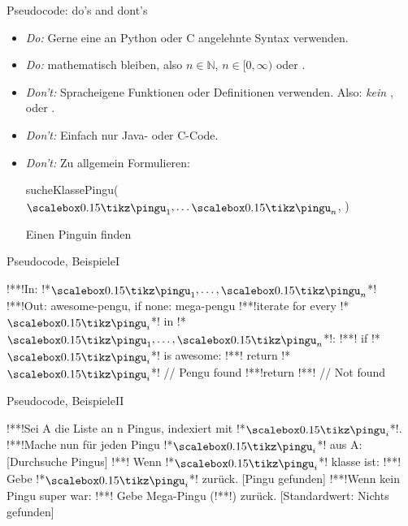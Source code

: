 \begin{frame}[t]{Pseudocode: do's and dont's}
    \begin{itemize}[<+(1)->]
        \itemsep7.5pt
        \item \emph{Do:} Gerne eine an Python oder C angelehnte Syntax verwenden.
        \item \emph{Do:} mathematisch bleiben, also $n \in \mathbb{N}$, $n \in [0,\infty)$ oder .
        \item \emph{Don't:} Spracheigene  Funktionen oder Definitionen verwenden.\pause{} Also: \emph{kein} ,  oder .
        \item \emph{Don't:} Einfach nur Java- oder C-Code.
        \item \emph{Don't:} Zu allgemein Formulieren:\smallskip\pause
\setcounter{algocf}{3}
\begin{algorithm}[H]
\PreCode
\StartCode
    \pause sucheKlassePingu($\tpingu_1, \ldots \tpingu_n$, \raisebox{-1pt}{\scalebox{0.15}{\tikz{\tagent}}})\;
    \caption{Einen  Pinguin finden}
\end{algorithm}
    \end{itemize}
\end{frame}

\begin{frame}[fragile,c]{Pseudocode, Beispiele\hfill I}
\begin{plainvoid}[morecomment={[l]//}]
!**!In: !*$\tpingu_1, \ldots, \tpingu_n$*!
!**!Out: awesome-pengu, if none: mega-pengu
!**!iterate for every !*$\tpingu_i$*! in !*$\tpingu_1, \ldots, \tpingu_n$*!:
!**!    if !*$\tpingu_i$*! is awesome: !**! return !*$\tpingu_i$*! // Pengu found
!**!return !*\raisebox{-1pt}{\scalebox{0.15}{\tikz{\tagent}}}*! // Not found
\end{plainvoid}
\end{frame}

\begin{frame}[fragile,c]{Pseudocode, Beispiele\hfill II}
\begin{plainvoid}[morecomment={[s]\[\]}]
!**!Sei A die Liste an n Pingus, indexiert mit !*$\tpingu_i$*!.
!**!Mache nun für jeden Pingu !*$\tpingu_i$*! aus A: [Durchsuche Pingus]
!**!    Wenn !*$\tpingu_i$*! klasse ist:
!**!            Gebe !*$\tpingu_i$*! zurück. [Pingu gefunden]
!**!Wenn kein Pingu super war:
!**!    Gebe Mega-Pingu (!*\raisebox{-1pt}{\scalebox{0.15}{\tikz{\tagent}}}*!) zurück. [Standardwert: Nichts gefunden]
\end{plainvoid}
\end{frame}
\fi

